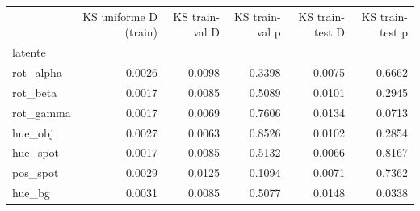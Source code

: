 \begin{tabular}{lrrrrr}
\toprule
 & KS uniforme D (train) & KS train-val D & KS train-val p & KS train-test D & KS train-test p \\
latente &  &  &  &  &  \\
\midrule
rot\_alpha & 0.0026 & 0.0098 & 0.3398 & 0.0075 & 0.6662 \\
rot\_beta & 0.0017 & 0.0085 & 0.5089 & 0.0101 & 0.2945 \\
rot\_gamma & 0.0017 & 0.0069 & 0.7606 & 0.0134 & 0.0713 \\
hue\_obj & 0.0027 & 0.0063 & 0.8526 & 0.0102 & 0.2854 \\
hue\_spot & 0.0017 & 0.0085 & 0.5132 & 0.0066 & 0.8167 \\
pos\_spot & 0.0029 & 0.0125 & 0.1094 & 0.0071 & 0.7362 \\
hue\_bg & 0.0031 & 0.0085 & 0.5077 & 0.0148 & 0.0338 \\
\bottomrule
\end{tabular}
